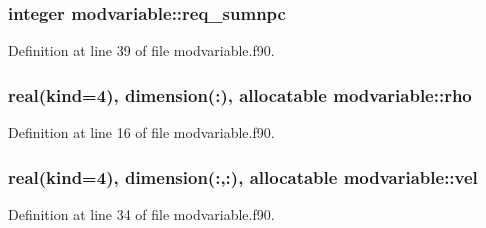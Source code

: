 \subsubsection[{\texorpdfstring{req\+\_\+sumnpc}{req_sumnpc}}]{\setlength{\rightskip}{0pt plus 5cm}integer modvariable\+::req\+\_\+sumnpc}\hypertarget{namespacemodvariable_adfc8585ffcde6504507af946c0afbea8}{}\label{namespacemodvariable_adfc8585ffcde6504507af946c0afbea8}


Definition at line 39 of file modvariable.\+f90.

\subsubsection[{\texorpdfstring{rho}{rho}}]{\setlength{\rightskip}{0pt plus 5cm}real(kind=4), dimension(\+:), allocatable modvariable\+::rho}\hypertarget{namespacemodvariable_a29eaedbfcc5873ff326af3c93e5558c6}{}\label{namespacemodvariable_a29eaedbfcc5873ff326af3c93e5558c6}


Definition at line 16 of file modvariable.\+f90.

\subsubsection[{\texorpdfstring{vel}{vel}}]{\setlength{\rightskip}{0pt plus 5cm}real(kind=4), dimension(\+:,\+:), allocatable modvariable\+::vel}\hypertarget{namespacemodvariable_a831a3150acc512605f816895b63eab56}{}\label{namespacemodvariable_a831a3150acc512605f816895b63eab56}


Definition at line 34 of file modvariable.\+f90.


